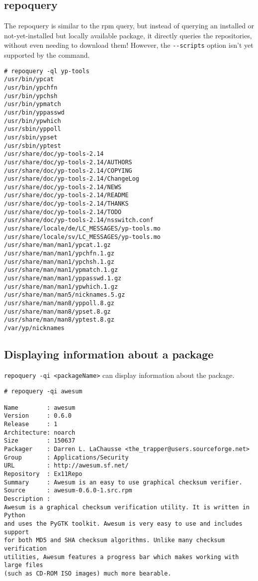 \subsection{repoquery}
The repoquery is similar to the rpm query, but instead of querying an installed or not-yet-installed but locally available package, it directly queries the repositories, without even needing to download them! However, the \verb|--scripts| option isn't yet supported by the command. 

\vspace{-15pt}
\begin{verbatim}
# repoquery -ql yp-tools
/usr/bin/ypcat
/usr/bin/ypchfn
/usr/bin/ypchsh
/usr/bin/ypmatch
/usr/bin/yppasswd
/usr/bin/ypwhich
/usr/sbin/yppoll
/usr/sbin/ypset
/usr/sbin/yptest
/usr/share/doc/yp-tools-2.14
/usr/share/doc/yp-tools-2.14/AUTHORS
/usr/share/doc/yp-tools-2.14/COPYING
/usr/share/doc/yp-tools-2.14/ChangeLog
/usr/share/doc/yp-tools-2.14/NEWS
/usr/share/doc/yp-tools-2.14/README
/usr/share/doc/yp-tools-2.14/THANKS
/usr/share/doc/yp-tools-2.14/TODO
/usr/share/doc/yp-tools-2.14/nsswitch.conf
/usr/share/locale/de/LC_MESSAGES/yp-tools.mo
/usr/share/locale/sv/LC_MESSAGES/yp-tools.mo
/usr/share/man/man1/ypcat.1.gz
/usr/share/man/man1/ypchfn.1.gz
/usr/share/man/man1/ypchsh.1.gz
/usr/share/man/man1/ypmatch.1.gz
/usr/share/man/man1/yppasswd.1.gz
/usr/share/man/man1/ypwhich.1.gz
/usr/share/man/man5/nicknames.5.gz
/usr/share/man/man8/yppoll.8.gz
/usr/share/man/man8/ypset.8.gz
/usr/share/man/man8/yptest.8.gz
/var/yp/nicknames
\end{verbatim}
\vspace{-10pt}

\subsection{Displaying information about a package}
\verb|repoquery -qi <packageName>| can display information about the package.

\vspace{-15pt}
\begin{verbatim}
# repoquery -qi awesum

Name        : awesum
Version     : 0.6.0
Release     : 1
Architecture: noarch
Size        : 150637
Packager    : Darren L. LaChausse <the_trapper@users.sourceforge.net>
Group       : Applications/Security
URL         : http://awesum.sf.net/
Repository  : Ex11Repo
Summary     : Awesum is an easy to use graphical checksum verifier.
Source      : awesum-0.6.0-1.src.rpm
Description :
Awesum is a graphical checksum verification utility. It is written in Python
and uses the PyGTK toolkit. Awesum is very easy to use and includes support
for both MD5 and SHA checksum algorithms. Unlike many checksum verification
utilities, Awesum features a progress bar which makes working with large files
(such as CD-ROM ISO images) much more bearable.
\end{verbatim}
\vspace{-10pt}
